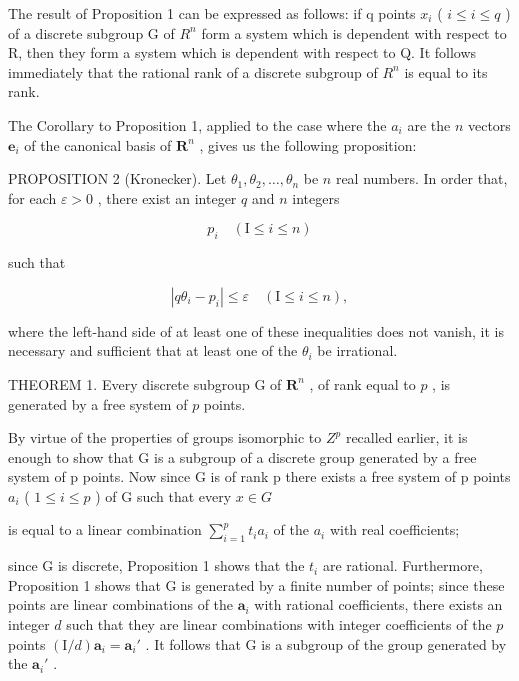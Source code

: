 The result of Proposition 1 can be expressed as follows: if q points \(x_{i}\) ( \(i \leqslant i \leqslant q\) ) of a discrete subgroup G of \(R^{n}\) form a system which is dependent with respect to R, then they form a system which is dependent with respect to Q. It follows immediately that the rational rank of a discrete subgroup of \(R^{n}\) is equal to its rank.

The Corollary to Proposition 1, applied to the case where the \(a_{i}\) are the \(n\) vectors \(\pmb{e}_{i}\) of the canonical basis of \(\mathbf{R}^{n}\) , gives us the following proposition:

PROPOSITION 2 (Kronecker). Let \(\theta_{1}, \theta_{2}, \ldots, \theta_{n}\) be \(n\) real numbers. In order that, for each \(\varepsilon > 0\) , there exist an integer \(q\) and \(n\) integers

\[
p _ {i} \quad (\mathrm{I} \leqslant i \leqslant n)
\]

such that

\[
\left| q \theta_ {i} - p _ {i} \right| \leqslant \varepsilon \quad (\mathrm{I} \leqslant i \leqslant n),
\]

where the left-hand side of at least one of these inequalities does not vanish, it is necessary and sufficient that at least one of the \(\theta_{i}\) be irrational.

THEOREM 1. Every discrete subgroup G of \(\mathbf{R}^n\) , of rank equal to \(p\) , is generated by a free system of \(p\) points.

By virtue of the properties of groups isomorphic to \(Z^{p}\) recalled earlier, it is enough to show that G is a subgroup of a discrete group generated by a free system of p points. Now since G is of rank p there exists a free system of p points \(a_{i}\) ( \(1 \leqslant i \leqslant p\) ) of G such that every \(x \in G\)

is equal to a linear combination \(\sum_{i=1}^{p} t_i a_i\) of the \(a_i\) with real coefficients;

since G is discrete, Proposition 1 shows that the \(t_i\) are rational. Furthermore, Proposition 1 shows that G is generated by a finite number of points; since these points are linear combinations of the \(\boldsymbol{a}_i\) with rational coefficients, there exists an integer \(d\) such that they are linear combinations with integer coefficients of the \(p\) points \((\mathrm{I}/d)\boldsymbol{a}_i = \boldsymbol{a}_i'\) . It follows that G is a subgroup of the group generated by the \(\boldsymbol{a}_i'\) .


